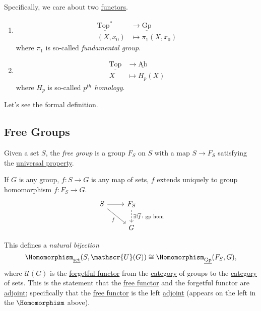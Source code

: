 Specifically, we care about two \hyperref[def:functor]{functors}.
\begin{enumerate}
	\item
	      \[
		      \begin{split}
			      \underline{\mathrm{Top}^*} &\to \underline{\mathrm{Gp}} \\
			      (X, x_0)&\mapsto \pi_1(X, x_0)
		      \end{split}
	      \]
	      where \(\pi _1\) is so-called \emph{fundamental group}.
	\item
	      \[
		      \begin{split}
			      \underline{\mathrm{Top}} &\to \underline{\mathrm{Ab}} \\
			      X&\mapsto H_{p} (X)
		      \end{split}
	      \]
	      where \(H_{p}\) is so-called \emph{\(p^{th}\) homology}.
\end{enumerate}

Let's see the formal definition.

\subsection{Free Groups}
\begin{definition}\label{def:free-group}
	Given a set \(S\), the \emph{free group} is a group \(F_S\) on \(S\) with a map \(S\to F_S\) satisfying the
	\underline{universal property}.

	If \(G\) is any group, \(f\colon S\to G\) is any map of sets, \(f\) extends uniquely to group homomorphism \(\overline{f} \colon F_S \to G\).
	\[
		\begin{tikzcd}
			S \ar[rd, "f"']\ar[r, ] & F_S\ar[d, dashed, "\exists ! \overline{f} \colon \text{gp hom} "]\\
			& G
		\end{tikzcd}
	\]
\end{definition}
\begin{note}
	This defines a \emph{natural bijection}
	\[
		\Homomorphism_{\underline{\mathrm{set}}}(S, \mathscr{U}(G))\cong \Homomorphism_{\underline{\mathrm{Gp}}}(F_S, G),
	\]
	where \(\mathscr{U} (G)\) is the \hyperref[eg:forgetful-functor]{forgetful functor} from the
	\hyperref[def:category]{category} of groups to the \hyperref[def:category]{category} of sets. This is the
	statement that the \hyperref[eg:free-functor]{free functor} and the forgetful functor are \hyperref[def:adjoint-functor]{adjoint};
	specifically that the \hyperref[eg:free-functor]{free functor} is the left \hyperref[def:adjoint-functor]{adjoint} (appears on the left in the \(\Homomorphism\) above).
\end{note}

